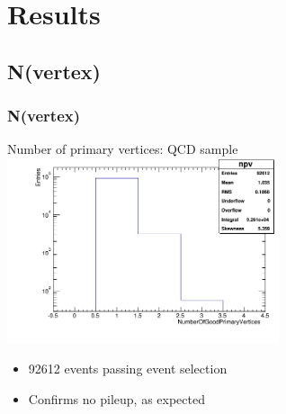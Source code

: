 \documentclass[bigger]{beamer}
\begin{document}
\section{Results}
\label{sec-3}
\subsection{N(vertex)}
\label{sec-3-1}
\begin{frame}
\frametitle{N(vertex)}
\label{sec-3-1-1}
\label{sec-3-1-1-1}

\centering
Number of primary vertices: QCD sample
\includegraphics[width=0.6\textwidth]{fig/npv_QCD1800.png}
\label{sec-3-1-1-2}
\begin{itemize}

\item 92612 events passing event selection
\label{sec-3-1-1-2-1}%

\item Confirms no pileup, as expected
\label{sec-3-1-1-2-2}%
\end{itemize} %
\end{frame}
\end{document}
